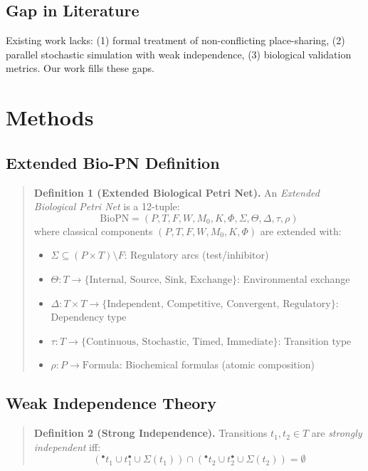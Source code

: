 \documentclass[twocolumn,11pt]{article}
\newcommand{\preset}[1]{\ensuremath{{}^{\bullet}#1}}
\newcommand{\postset}[1]{\ensuremath{#1^{\bullet}}}
\newcommand{\RegSet}[1]{\ensuremath{\Sigma(#1)}}
\begin{document}
\subsection{Gap in Literature}

Existing work lacks: (1) formal treatment of non-conflicting place-sharing, (2) parallel stochastic simulation with weak independence, (3) biological validation metrics. Our work fills these gaps.

\section{Methods}

\subsection{Extended Bio-PN Definition}

\begin{quote}
\textbf{Definition 1 (Extended Biological Petri Net).}
An \emph{Extended Biological Petri Net} is a 12-tuple:
\begin{equation}
\text{BioPN} = (P, T, F, W, M_0, K, \Phi, \Sigma, \Theta, \Delta, \tau, \rho)
\end{equation}
where classical components $(P, T, F, W, M_0, K, \Phi)$ are extended with:
\begin{itemize}
    \item $\Sigma \subseteq (P \times T) \setminus F$: Regulatory arcs (test/inhibitor)
    \item $\Theta: T \to \{\text{Internal, Source, Sink, Exchange}\}$: Environmental exchange
    \item $\Delta: T \times T \to \{\text{Independent, Competitive, Convergent, Regulatory}\}$: Dependency type
    \item $\tau: T \to \{\text{Continuous, Stochastic, Timed, Immediate}\}$: Transition type
    \item $\rho: P \to \text{Formula}$: Biochemical formulas (atomic composition)
\end{itemize}
\end{quote}

\subsection{Weak Independence Theory}

\begin{quote}
\textbf{Definition 2 (Strong Independence).}
Transitions $t_1, t_2 \in T$ are \emph{strongly independent} iff:
\begin{equation}
(\preset{t_1} \cup \postset{t_1} \cup \RegSet{t_1}) \cap (\preset{t_2} \cup \postset{t_2} \cup \RegSet{t_2}) = \emptyset
\end{equation}
\end{quote}
\end{document}
